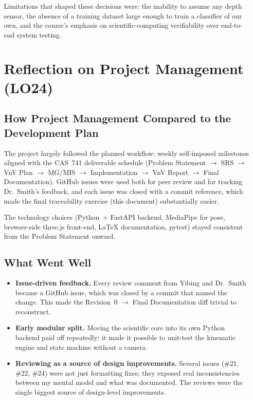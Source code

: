 \documentclass{article}
\begin{document}
Limitations that shaped these decisions were: the inability to assume any
depth sensor, the absence of a training dataset large enough to train a
classifier of our own, and the course's emphasis on scientific-computing
verifiability over end-to-end system testing.

\section{Reflection on Project Management (LO24)}

\subsection{How Project Management Compared to the Development Plan}

The project largely followed the planned workflow: weekly self-imposed
milestones aligned with the CAS~741 deliverable schedule (Problem Statement
$\rightarrow$ SRS $\rightarrow$ VnV Plan $\rightarrow$ MG/MIS $\rightarrow$
Implementation $\rightarrow$ VnV Report $\rightarrow$ Final
Documentation). GitHub issues were used both for peer review and for
tracking Dr.~Smith's feedback, and each issue was closed with a commit
reference, which made the final traceability exercise (this document)
substantially easier.

The technology choices (Python~+ FastAPI backend, MediaPipe for pose,
browser-side three.js front-end, LaTeX documentation, pytest) stayed
consistent from the Problem Statement onward.

\subsection{What Went Well}

\begin{itemize}
  \item \textbf{Issue-driven feedback.} Every review comment from Yibing and
  Dr.~Smith became a GitHub issue, which was closed by a commit that named
  the change. This made the Revision~0 $\rightarrow$ Final Documentation
  diff trivial to reconstruct.
  \item \textbf{Early modular split.} Moving the scientific core into its
  own Python backend paid off repeatedly: it made it possible to unit-test
  the kinematic engine and state machine without a camera.
  \item \textbf{Reviewing as a source of design improvements.} Several
  issues (\#21, \#22, \#24) were not just formatting fixes; they exposed
  real inconsistencies between my mental model and what was documented. The
  reviews were the single biggest source of design-level improvements.
\end{itemize}
\end{document}
